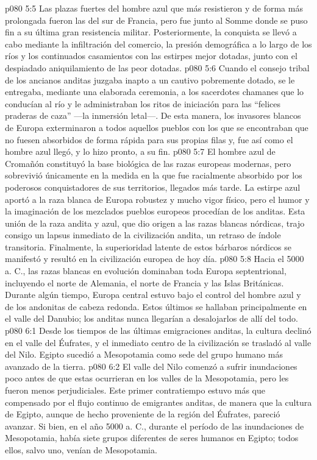 \vs p080 5:5 \pc Las plazas fuertes del hombre azul que más resistieron y de forma más prolongada fueron las del sur de Francia, pero fue junto al Somme donde se puso fin a su última gran resistencia militar. Posteriormente, la conquista se llevó a cabo mediante la infiltración del comercio, la presión demográfica a lo largo de los ríos y los continuados casamientos con las estirpes mejor dotadas, junto con el despiadado aniquilamiento de las peor dotadas.
\vs p080 5:6 Cuando el consejo tribal de los ancianos anditas juzgaba inapto a un cautivo pobremente dotado, se le entregaba, mediante una elaborada ceremonia, a los sacerdotes chamanes que lo conducían al río y le administraban los ritos de iniciación para las “felices praderas de caza” ---la inmersión letal---. De esta manera, los invasores blancos de Europa exterminaron a todos aquellos pueblos con los que se encontraban que no fuesen absorbidos de forma rápida para sus propias filas y, fue así como el hombre azul llegó, y lo hizo pronto, a su fin.
\vs p080 5:7 \pc El hombre azul de Cromañón constituyó la base biológica de las razas europeas modernas, pero sobrevivió únicamente en la medida en la que fue racialmente absorbido por los poderosos conquistadores de sus territorios, llegados más tarde. La estirpe azul aportó a la raza blanca de Europa robustez y mucho vigor físico, pero el humor y la imaginación de los mezclados pueblos europeos procedían de los anditas. Esta unión de la raza andita y azul, que dio origen a las razas blancas nórdicas, trajo consigo un lapsus inmediato de la civilización andita, un retraso de índole transitoria. Finalmente, la superioridad latente de estos bárbaros nórdicos se manifestó y resultó en la civilización europea de hoy día.
\vs p080 5:8 \pc Hacia el 5000 a. C., las razas blancas en evolución dominaban toda Europa septentrional, incluyendo el norte de Alemania, el norte de Francia y las Islas Británicas. Durante algún tiempo, Europa central estuvo bajo el control del hombre azul y de los andonitas de cabeza redonda. Estos últimos se hallaban principalmente en el valle del Danubio; los anditas nunca llegarían a desalojarlos de allí del todo.
\vs p080 6:1 Desde los tiempos de las últimas emigraciones anditas, la cultura declinó en el valle del Éufrates, y el inmediato centro de la civilización se trasladó al valle del Nilo. Egipto sucedió a Mesopotamia como sede del grupo humano más avanzado de la tierra.
\vs p080 6:2 El valle del Nilo comenzó a sufrir inundaciones poco antes de que estas ocurrieran en los valles de la Mesopotamia, pero les fueron menos perjudiciales. Este primer contratiempo estuvo más que compensado por el flujo continuo de emigrantes anditas, de manera que la cultura de Egipto, aunque de hecho proveniente de la región del Éufrates, pareció avanzar. Si bien, en el año 5000 a. C., durante el período de las inundaciones de Mesopotamia, había siete grupos diferentes de seres humanos en Egipto; todos ellos, salvo uno, venían de Mesopotamia.
